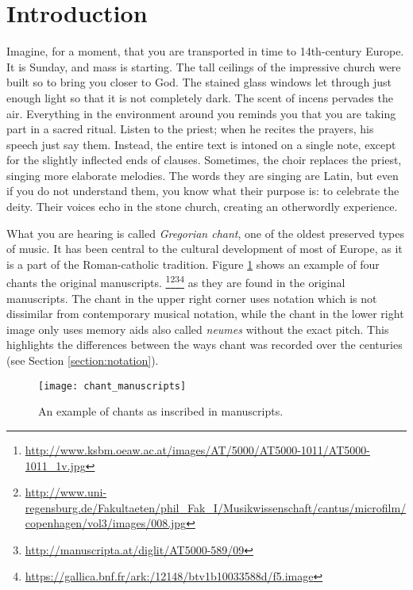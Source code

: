 \chapter*{Introduction}

Imagine, for a moment, that you are transported in time to 14th-century Europe. It is Sunday, and mass is
starting. The tall ceilings of the impressive church were built so to bring you closer to God. The stained glass windows
let through just enough light so that it is not completely dark. The scent of incens pervades the air. Everything in the environment around
you reminds you that you are taking part in a sacred ritual. Listen to the priest; when he recites the prayers, his speech just say them.
Instead, the entire text is intoned on a single note, except for the slightly inflected ends of clauses. 
Sometimes, the choir replaces the priest, singing more elaborate melodies. The words they are singing are Latin, but even 
if you do not understand them, you know what their purpose is: to celebrate the deity. Their voices echo in the stone church, creating an
otherwordly experience.

What you are hearing is called \emph{Gregorian chant}, one of the oldest preserved types of music. It has been central to the cultural development
of most of Europe, as it is a part of the Roman-catholic tradition. Figure \ref{fig:chant_manuscripts} shows an example of four chants the original manuscripts.
\footnote{\url{http://www.ksbm.oeaw.ac.at/images/AT/5000/AT5000-1011/AT5000-1011\_1v.jpg}}\footnote{\url{http://www.uni-regensburg.de/Fakultaeten/phil\_Fak\_I/Musikwissenschaft/cantus/microfilm/copenhagen/vol3/images/008.jpg}}\footnote{\url{http://manuscripta.at/diglit/AT5000-589/09}}\footnote{\url{https://gallica.bnf.fr/ark:/12148/btv1b10033588d/f5.image}} as they are found in
the original manuscripts. The chant in the upper right corner uses notation which is not dissimilar from contemporary musical notation,
while the chant in the lower right image only uses memory aids also called \emph{neumes} without the exact pitch. This highlights the differences
between the ways chant was recorded over the centuries (see Section \ref{section:notation}).

\begin{figure}[h]
\centering
\texttt{[image: chant\_manuscripts]}
\caption{An example of chants as inscribed in manuscripts.}
\label{fig:chant_manuscripts}
\end{figure}

